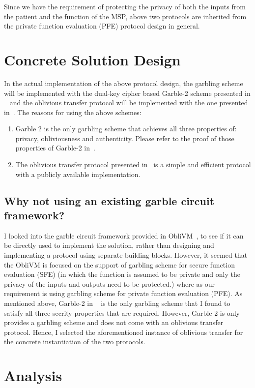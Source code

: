 \documentclass[10pt,letterpaper]{article}
\begin{document}
\begin{multicols}{2}
Since we have the requirement of protecting the privacy of both the inputs from the patient and the function of the MSP, above two protocols are 
inherited from the private function evaluation (PFE) protocol design in general. 

\section{Concrete Solution Design}
In the actual implementation of the above protocol design, the garbling scheme will be implemented with the dual-key cipher based Garble-2 scheme presented 
in ~\cite{FoundationsGC} and the oblivious transfer protocol will be implemented with the one presented in~\cite{OT}.
The reasons for using the above schemes:
\begin{enumerate}
 \item Garble 2 is the only garbling scheme that achieves all three properties of: privacy, obliviousness and authenticity. Please refer to the proof of 
 those properties of Garble-2 in~\cite{FoundationsGC}.
 \item The oblivious transfer protocol presented in~\cite{OT} is a simple and efficient protocol with a publicly available implementation.
\end{enumerate}

\subsection{Why not using an existing garble circuit framework?}
I looked into the garble circuit framework provided in ObliVM~\cite{ObliVM}, to see if it can be directly used to implement the solution, rather than 
designing and implementing a protocol using separate building blocks. However, it seemed that the ObliVM is focused on the support of garbling scheme
for secure function evaluation (SFE) (in which the function is assumed to be private and only the privacy of the inputs and outputs need to be protected.)
where as our requirement is using garbling scheme for private function evaluation (PFE). As mentioned above, Garble-2 in ~\cite{FoundationsGC} is the
only garbling scheme that I found to satisfy all three secrity properties that are required. However, Garble-2 is only provides a garbling scheme and
does not come with an oblivious transfer protocol. Hence, I selected the aforementioned instance of oblivious transfer for the concrete instantiation
of the two protocols.


\section{Analysis}


\end{multicols}
\end{document}
